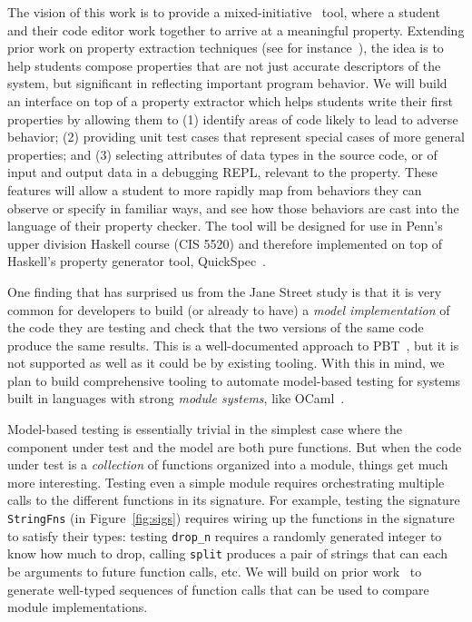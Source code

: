 The vision of this work is to provide a mixed-initiative~\cite{ref:allen1999mixed}
tool, where a student and their code editor work together to arrive at a
meaningful property. Extending prior work on property extraction techniques (see for
instance~\cite{ref:ammons2002mining, ref:le2018deep, ref:claessen2010quickspec,
smith_discovering_2017}), the idea is to help students compose properties that
are not just accurate descriptors of the system, but significant in reflecting
important program behavior. We will build an interface on top of a property
extractor which helps students write their first properties by allowing them
to (1) identify areas of code likely to lead to adverse behavior;
(2) providing unit test cases that represent special cases of more general
properties; and (3) selecting attributes of data types in the source code, or
of input and output data in a debugging REPL, relevant to the property. These
features will allow a student to more rapidly map from behaviors they can
observe or specify in familiar ways, and see how those behaviors are cast into
the language of their property checker.
%
The tool will be designed for use in Penn's upper division Haskell
course (CIS 5520) and therefore implemented on top of
Haskell's property
generator tool, QuickSpec~\cite{ref:claessen2010quickspec}.

One finding that has surprised us from the Jane Street study is that
it is {very} common for developers to build (or already to have) a
{\em model
implementation} of the code they are testing and check that the two versions of
the same code produce the same results.  This is a well-documented approach to
PBT~\cite{hughes_experiences_2016}, but it is not supported as well as it could
be by existing tooling.
%
With this in mind, we plan to build comprehensive tooling to automate
model-based testing for systems built in languages with strong {\em
  module systems}, like OCaml~\cite{macqueen_modules_1984}.

Model-based testing is essentially trivial in the simplest case where
the component under test and the model are both pure functions.  But
when the code under test is a {\em
  collection} of functions
organized into a module, things get much more interesting. Testing even a simple
module requires orchestrating multiple calls to the different functions in
its signature. For example, testing the signature \lstinline{StringFns} (in
Figure~\ref{fig:sigs}) requires wiring up the functions in the
signature to satisfy their types: testing \lstinline{drop_n} requires a randomly generated
integer to know how much to drop, calling \lstinline{split} produces a pair of strings
that can each be arguments to future function calls, etc. We will build on prior
work~\cite{hughes_experiences_2016} to generate well-typed sequences of function
calls that can be used to compare module implementations.

